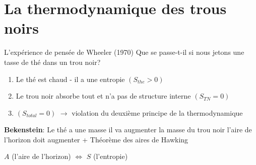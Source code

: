

\section{La thermodynamique des trous noirs}
\begin{frame}{\underline{\secname} }



\begin{block}{L’expérience de pensée de Wheeler (1970)}
Que se passe-t-il si nous jetons une tasse de thé dans un trou noir?
\pause
\begin{enumerate}
		\item Le thé est chaud - il a une entropie $(S_{the} > 0)$
		\pause
	\item Le trou noir absorbe tout et n'a pas de structure interne $(S_{TN} = 0)$
\pause
	\item $(S_{total} = 0)$  $\rightarrow$ violation du deuxième principe de la thermodynamique 
\end{enumerate}	
	
\end{block}

\pause
\textbf{Bekenstein}: Le thé a une masse  \Rightarrow il va augmenter la masse du trou noir \Rightarrow l'aire de l'horizon doit augmenter + Théorème des aires de Hawking

\pause

\begin{center}
{\Large $A$ (l'aire de l'horizon)   $\Leftrightarrow$     $S$ (l’entropie)}
\end{center}




\end{frame}

